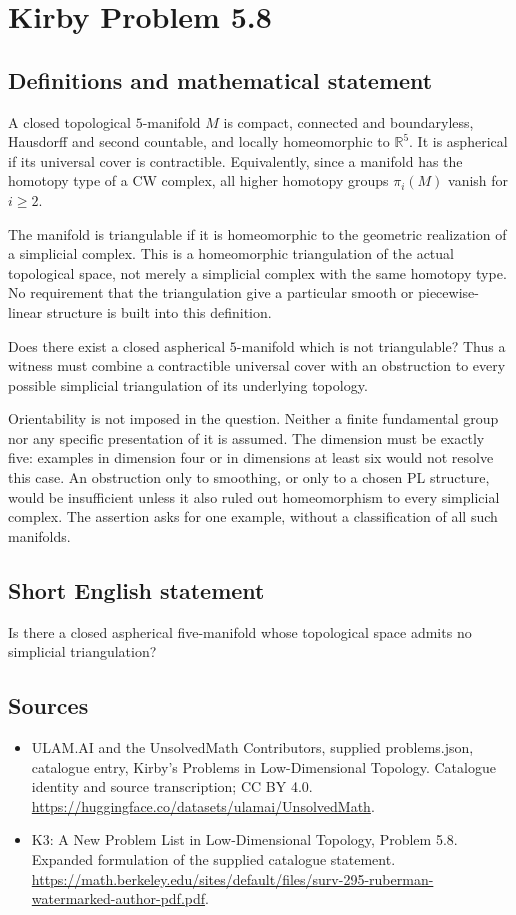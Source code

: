 \documentclass[11pt,a4paper]{article}
\begin{document}
\section*{Kirby Problem 5.8}\label{statement}

\subsection{Definitions and mathematical statement}
A closed topological $5$-manifold $M$ is compact, connected and
boundaryless, Hausdorff and second countable, and locally
homeomorphic to $\mathbb R^5$. It is aspherical if its universal
cover is contractible. Equivalently, since a manifold has the
homotopy type of a CW complex, all higher homotopy groups
$\pi_i(M)$ vanish for $i\ge2$.

The manifold is triangulable if it is homeomorphic to the
geometric realization of a simplicial complex. This is a
homeomorphic triangulation of the actual topological space,
not merely a simplicial complex with the same homotopy type.
No requirement that the triangulation give a particular smooth
or piecewise-linear structure is built into this definition.

Does there exist a closed aspherical $5$-manifold which is
not triangulable? Thus a witness must combine a contractible
universal cover with an obstruction to every possible simplicial
triangulation of its underlying topology.

Orientability is not imposed in the question. Neither a finite
fundamental group nor any specific presentation of it is assumed.
The dimension must be exactly five: examples in dimension four
or in dimensions at least six would not resolve this case.
An obstruction only to smoothing, or only to a chosen PL
structure, would be insufficient unless it also ruled out
homeomorphism to every simplicial complex. The assertion asks
for one example, without a classification of all such manifolds.
\subsection{Short English statement}
Is there a closed aspherical five-manifold whose topological space admits no simplicial triangulation?
\subsection{Sources}
\begin{itemize}
\item[S1] ULAM.AI and the UnsolvedMath Contributors, supplied problems.json, catalogue entry, Kirby's Problems in Low-Dimensional Topology. Catalogue identity and source transcription; CC BY 4.0.
\url{https://huggingface.co/datasets/ulamai/UnsolvedMath}.
\item[S2] K3: A New Problem List in Low-Dimensional Topology, Problem 5.8. Expanded formulation of the supplied catalogue statement.
\url{https://math.berkeley.edu/sites/default/files/surv-295-ruberman-watermarked-author-pdf.pdf}.
\end{itemize}
\end{document}
